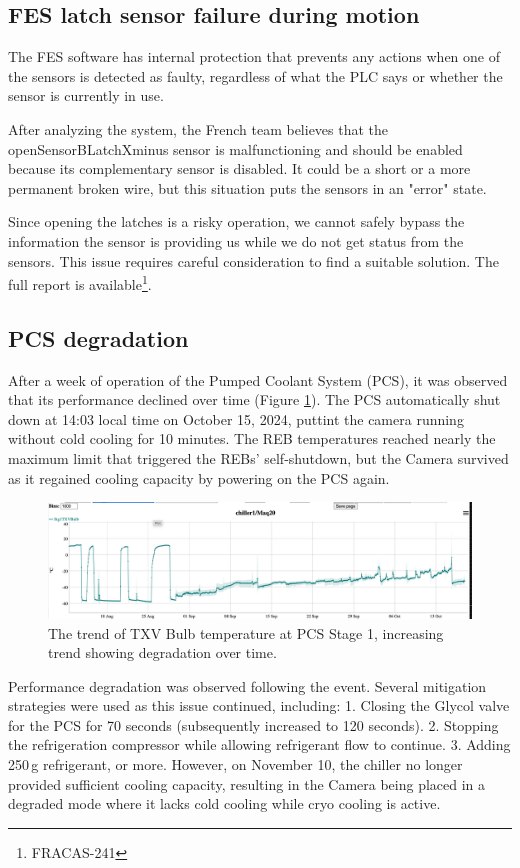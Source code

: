 \subsection{FES latch sensor failure during motion}
The FES software has internal protection that prevents any actions when one of the sensors is detected as faulty, regardless of what the PLC says or whether the sensor is currently in use.

After analyzing the system, the French team believes that the openSensorBLatchXminus sensor is malfunctioning and should be enabled because its complementary sensor is disabled. It could be a short or a more permanent broken wire, but this situation puts the sensors in an "error" state.

Since opening the latches is a risky operation, we cannot safely bypass the information the sensor is providing us while we do not get status from the sensors. This issue requires careful consideration to find a suitable solution.
The full report is available\footnote{FRACAS-241}.

\subsection{PCS degradation}
After a week of operation of the Pumped Coolant System (PCS), it was observed that its performance declined over time (Figure \ref{fig:pcsdegradation}). The PCS automatically shut down at 14:03 local time on October 15, 2024, puttint the camera running without cold cooling for 10 minutes. The REB temperatures reached nearly the maximum limit that triggered the REBs' self-shutdown, but the Camera survived as it regained cooling capacity by powering on the PCS again.
\begin{figure}[ht]
    \centering
    \includegraphics[width=1\linewidth]{figures//Issues/PCSTXVBulbAug11toOct17.png}
    \caption{The trend of TXV Bulb temperature at PCS Stage 1, increasing trend showing degradation over time.}
    \label{fig:pcsdegradation}
\end{figure}

Performance degradation was observed following the event. Several mitigation strategies were used as this issue continued, including:
1. Closing the Glycol valve for the PCS for 70 seconds (subsequently increased to 120 seconds).
2. Stopping the refrigeration compressor while allowing refrigerant flow to continue.
3. Adding 250\,g refrigerant, or more.
However, on November 10, the chiller no longer provided sufficient cooling capacity, resulting in the Camera being placed in a degraded mode where it lacks cold cooling while cryo cooling is active.


